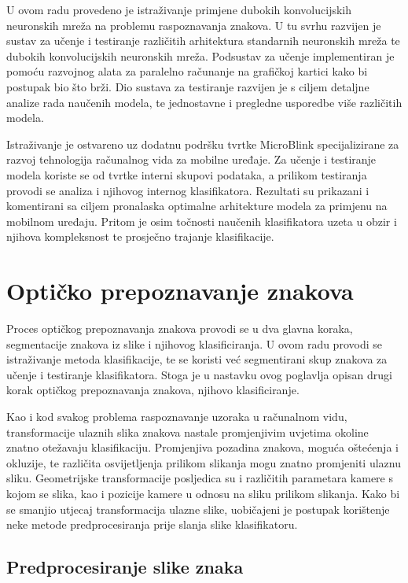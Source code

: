 \documentclass[lmodern, utf8, diplomski, numeric]{fer}
\begin{document}
U ovom radu provedeno je istraživanje primjene dubokih konvolucijskih neuronskih mreža na problemu raspoznavanja znakova. U tu svrhu razvijen je sustav za učenje i testiranje različitih arhitektura standarnih neuronskih mreža te dubokih konvolucijskih neuronskih mreža. Podsustav za učenje implementiran je pomoću razvojnog alata za paralelno računanje na grafičkoj kartici kako bi postupak bio što brži. Dio sustava za testiranje razvijen je s ciljem detaljne analize rada naučenih modela, te jednostavne i pregledne usporedbe više različitih modela. 

Istraživanje je ostvareno uz dodatnu podršku tvrtke MicroBlink specijalizirane za razvoj tehnologija računalnog vida za mobilne uređaje. Za učenje i testiranje modela koriste se od tvrtke interni skupovi podataka, a prilikom testiranja provodi se analiza i njihovog internog klasifikatora. 
Rezultati su prikazani i komentirani sa ciljem pronalaska optimalne arhitekture modela za primjenu na mobilnom uređaju. Pritom je osim točnosti naučenih klasifikatora uzeta u obzir i njihova kompleksnost te prosječno trajanje klasifikacije.





\chapter{Optičko prepoznavanje znakova}

Proces optičkog prepoznavanja znakova provodi se u dva glavna koraka, segmentacije znakova iz slike i njihovog klasificiranja. U ovom radu provodi se istraživanje metoda klasifikacije, te se koristi već segmentirani skup znakova za učenje i testiranje klasifikatora. Stoga je u nastavku ovog poglavlja opisan drugi korak optičkog prepoznavanja znakova, njihovo klasificiranje.

Kao i kod svakog problema raspoznavanje uzoraka u računalnom vidu, transformacije ulaznih slika znakova nastale promjenjivim uvjetima okoline znatno otežavaju klasifikaciju. Promjenjiva pozadina znakova, moguća oštećenja i okluzije, te različita osvijetljenja prilikom slikanja mogu znatno promjeniti ulaznu sliku. Geometrijske transformacije posljedica su i različitih parametara kamere s kojom se slika, kao i pozicije kamere u odnosu na sliku prilikom slikanja.  
Kako bi se smanjio utjecaj transformacija ulazne slike, uobičajeni je postupak korištenje neke metode predprocesiranja prije slanja slike klasifikatoru.

\section{Predprocesiranje slike znaka}
\end{document}
